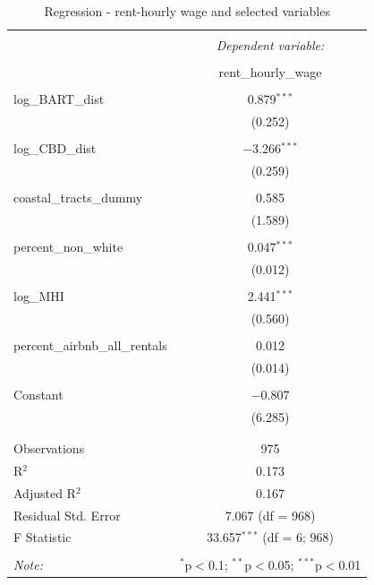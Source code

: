 \documentclass[10pt, letterpaper]{amsart}
\begin{document}
\begin{table}[!htbp] \centering 
  \caption{Regression - rent-hourly wage and selected variables} 
  \label{} 
  \begin{tabular}{@{\extracolsep{5pt}}lc} 
    \\[-1.8ex]\hline 
    \hline \\[-1.8ex] 
    & \multicolumn{1}{c}{\textit{Dependent variable:}} \\ 
    \cline{2-2} 
    \\[-1.8ex] & rent\_hourly\_wage \\ 
    \hline \\[-1.8ex] 
    log\_BART\_dist & 0.879$^{***}$ \\ 
    & (0.252) \\ 
    & \\ 
    log\_CBD\_dist & $-$3.266$^{***}$ \\ 
    & (0.259) \\ 
    & \\ 
    coastal\_tracts\_dummy & 0.585 \\ 
    & (1.589) \\ 
    & \\ 
    percent\_non\_white & 0.047$^{***}$ \\ 
    & (0.012) \\ 
    & \\ 
    log\_MHI & 2.441$^{***}$ \\ 
    & (0.560) \\ 
    & \\ 
    percent\_airbnb\_all\_rentals & 0.012 \\ 
    & (0.014) \\ 
    & \\ 
    Constant & $-$0.807 \\ 
    & (6.285) \\ 
    & \\ 
    \hline \\[-1.8ex] 
    Observations & 975 \\ 
    R$^{2}$ & 0.173 \\ 
    Adjusted R$^{2}$ & 0.167 \\ 
    Residual Std. Error & 7.067 (df = 968) \\ 
    F Statistic & 33.657$^{***}$ (df = 6; 968) \\ 
    \hline 
    \hline \\[-1.8ex] 
    \textit{Note:}  & \multicolumn{1}{r}{$^{*}$p$<$0.1; $^{**}$p$<$0.05; $^{***}$p$<$0.01} \\ 
  \end{tabular} 
\end{table}
\end{document}
